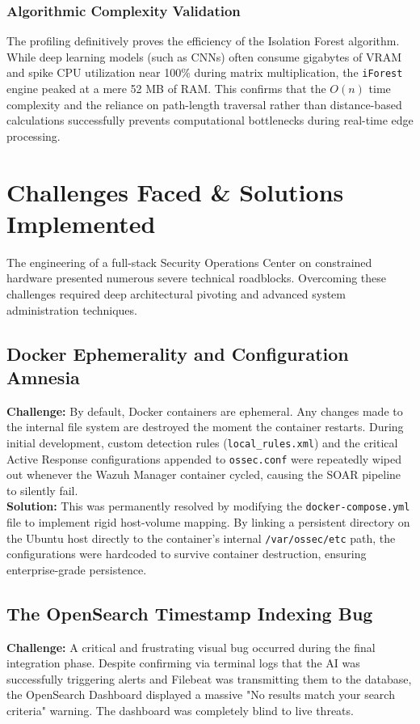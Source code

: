 \documentclass[12pt, a4paper]{report}
\begin{document}
	\subsection{Algorithmic Complexity Validation}
	The profiling definitively proves the efficiency of the Isolation Forest algorithm. While deep learning models (such as CNNs) often consume gigabytes of VRAM and spike CPU utilization near 100\% during matrix multiplication, the \texttt{iForest} engine peaked at a mere 52 MB of RAM. This confirms that the $O(n)$ time complexity and the reliance on path-length traversal rather than distance-based calculations successfully prevents computational bottlenecks during real-time edge processing.
	
	\chapter{Challenges Faced \& Solutions Implemented}
	\onehalfspacing
	
	The engineering of a full-stack Security Operations Center on constrained hardware presented numerous severe technical roadblocks. Overcoming these challenges required deep architectural pivoting and advanced system administration techniques.
	
	\section{Docker Ephemerality and Configuration Amnesia}
	\textbf{Challenge:} By default, Docker containers are ephemeral. Any changes made to the internal file system are destroyed the moment the container restarts. During initial development, custom detection rules (\texttt{local\_rules.xml}) and the critical Active Response configurations appended to \texttt{ossec.conf} were repeatedly wiped out whenever the Wazuh Manager container cycled, causing the SOAR pipeline to silently fail. \\
	\textbf{Solution:} This was permanently resolved by modifying the \texttt{docker-compose.yml} file to implement rigid host-volume mapping. By linking a persistent directory on the Ubuntu host directly to the container's internal \texttt{/var/ossec/etc} path, the configurations were hardcoded to survive container destruction, ensuring enterprise-grade persistence.
	
	\section{The OpenSearch Timestamp Indexing Bug}
	\textbf{Challenge:} A critical and frustrating visual bug occurred during the final integration phase. Despite confirming via terminal logs that the AI was successfully triggering alerts and Filebeat was transmitting them to the database, the OpenSearch Dashboard displayed a massive "No results match your search criteria" warning. The dashboard was completely blind to live threats.\\
	
\end{document}
